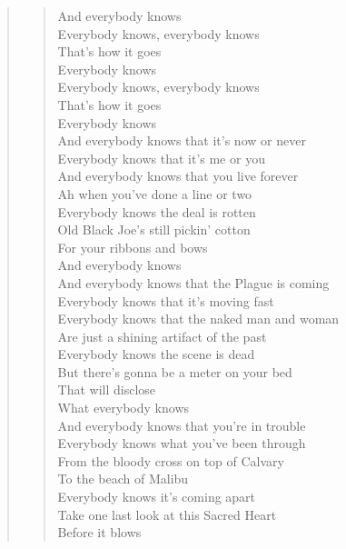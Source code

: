 \documentclass[a4paper]{article}
\begin{document}
\begin{quote}
\begin{verse}
\begin{centering}
			And everybody knows \\
		\vspace{.1in}
			Everybody knows, everybody knows \\
			That's how it goes \\
			Everybody knows \\
		\vspace{.1in}
			Everybody knows, everybody knows \\
			That's how it goes \\
			Everybody knows \\
		\vspace{.1in}
			And everybody knows that it's now or never \\
			Everybody knows that it's me or you \\
			And everybody knows that you live forever \\
			Ah when you've done a line or two \\
			Everybody knows the deal is rotten \\
			Old Black Joe's still pickin' cotton \\
			For your ribbons and bows \\
			And everybody knows \\
		\vspace{.1in}
			And everybody knows that the Plague is coming \\
			Everybody knows that it's moving fast \\
			Everybody knows that the naked man and woman \\
			Are just a shining artifact of the past \\
			Everybody knows the scene is dead \\
			But there's gonna be a meter on your bed \\
			That will disclose \\
			What everybody knows \\
		\vspace{.1in}
			And everybody knows that you're in trouble \\
			Everybody knows what you've been through \\
			From the bloody cross on top of Calvary \\
			To the beach of Malibu \\
			Everybody knows it's coming apart \\
			Take one last look at this Sacred Heart \\
			Before it blows \\

\end{centering}
\end{verse}
\end{quote}
\end{document}

